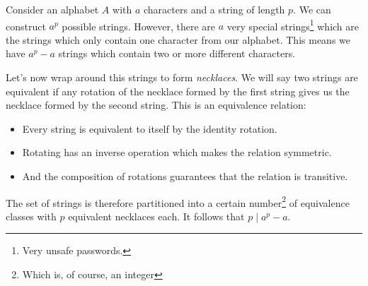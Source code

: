 \documentclass[12pt]{memoir}
\begin{document}
\begin{ptcbr}
    Consider an alphabet $A$ with $a$ characters and a string of length $p$. We can construct $a^p$ possible strings. However, there are $a$ very special strings\footnote{Very unsafe passwords.} which are the strings which only contain one character from our alphabet. This means we have $a^p-a$ strings which contain two or more different characters.\par 
    Let's now wrap around this strings to form \emph{necklaces}. We will say two strings are equivalent if any rotation of the necklace formed by the first string gives us the necklace formed by the second string. This is an equivalence relation:
    \begin{itemize}
        \itemsep=-0.4em
        \item Every string is equivalent to itself by the identity rotation.
        \item Rotating has an inverse operation which makes the relation symmetric.
        \item And the composition of rotations guarantees that the relation is transitive.
    \end{itemize}
    The set of strings is therefore partitioned into a certain number\footnote{Which is, of course, an integer} of equivalence classes with $p$ equivalent necklaces each. It follows that $p\mid a^p-a$.
\end{ptcbr}
\end{document}
